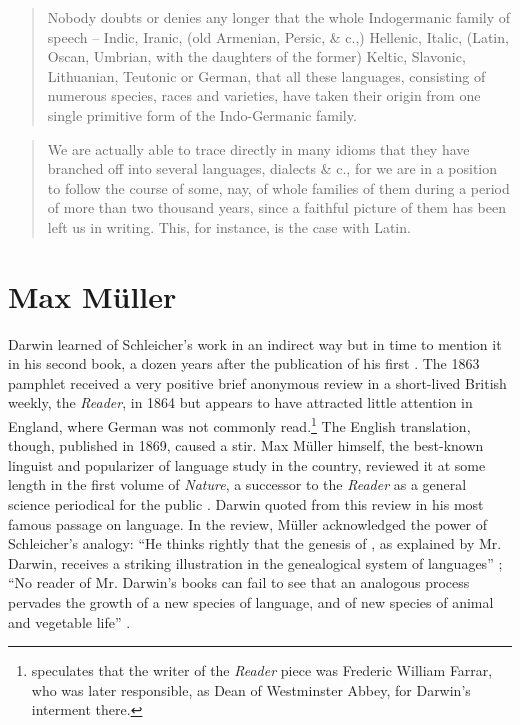 \documentclass[output=paper,
modfonts
]{LSP/langsci}
\begin{document}
\begin{quote}
Nobody doubts or denies any longer that the whole Indogermanic family of speech -- Indic, Iranic, (old Armenian, Persic, \& c.,) Hellenic, Italic, (Latin, Oscan, Umbrian, with the daughters of the former) Keltic, Slavonic, Lithuanian, Teutonic or German, that all these languages, consisting of numerous species, races and varieties, have taken their origin from one single primitive form of the Indo-Germanic family. \citep[34]{Schleicher1863}
\end{quote}

\begin{quote}
We are actually able to trace directly in many idioms that they have branched off into several languages, dialects \& c., for we are in a position to follow the course of some, nay, of whole families of them during a period of more than two thousand years, since a faithful picture of them has been left us in writing. This, for instance, is the case with Latin. \citep[41--42]{Schleicher1863}
\end{quote}

\section{Max Müller}

Darwin learned of Schleicher's work in an indirect way but in time to mention it in his second book, a dozen years after the publication of his first \citep{Darwin1871}. The 1863 pamphlet received a very positive brief anonymous review in a short-lived British weekly, the \textit{Reader}, in 1864 but appears to have attracted little attention in England, where German was not commonly read.\footnote{ \citet{alter1999} speculates that the writer of the \textit{Reader} piece was Frederic William Farrar, who was later responsible, as Dean of Westminster Abbey, for Darwin's interment there.} The English translation, though, published in 1869, caused a stir. Max Müller himself, the best-known linguist and popularizer of language study in the country, reviewed it at some length in the first volume of \textit{Nature}, a successor to the \textit{Reader} as a general science periodical for the public \citep{muller1870}.  Darwin quoted from this review in his most famous passage on language.  In the review, Müller acknowledged the power of Schleicher's analogy: ``He thinks rightly that the genesis of , as explained by Mr. Darwin, receives a striking illustration in the genealogical system of languages'' \citep[257]{muller1870}; ``No reader of Mr. Darwin's books can fail to see that an analogous process pervades the growth of a new species of language, and of new species of animal and vegetable life'' \citep[258]{muller1870}.
\end{document}
